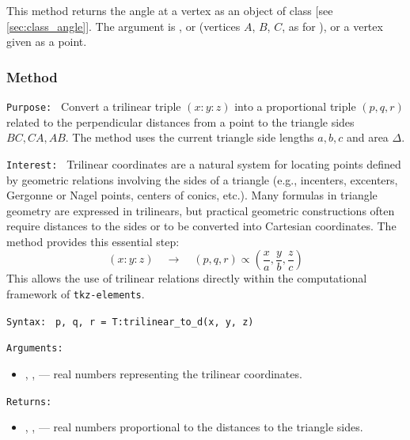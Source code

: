 This method returns the angle at a vertex as an object of class
 [see \ref{sec:class_angle}].
The argument  is ,  or  (vertices $A$, $B$, $C$,
as for ), or a vertex given as a point.

\begin{tkzexample}
\end{tkzexample}

\subsubsection{Method }
\label{ssub:triangle_trilinear_to_d}

\texttt{Purpose: }
Convert a trilinear triple \((x:y:z)\) into a proportional triple \((p,q,r)\) related to the perpendicular distances from a point to the triangle sides \(BC,CA,AB\).
The method uses the current triangle side lengths \(a,b,c\) and area \(\Delta\).

\medskip
\texttt{Interest: }
Trilinear coordinates are a natural system for locating points defined by geometric relations involving the sides of a triangle
(e.g., incenters, excenters, Gergonne or Nagel points, centers of conics, etc.).
Many formulas in triangle geometry are expressed in trilinears, but practical geometric constructions often require
distances to the sides or to be converted into Cartesian coordinates.
The method  provides this essential step:
\[
(x:y:z) \quad \longrightarrow \quad (p,q,r) \propto \left(\frac{x}{a}, \frac{y}{b}, \frac{z}{c}\right)
\]
This allows the use of trilinear relations directly within the computational framework of \texttt{tkz-elements}.

\medskip
\texttt{Syntax: }
\verb|p, q, r = T:trilinear_to_d(x, y, z)|

\medskip
\texttt{Arguments: }
\begin{itemize}
  \item {}, ,  — real numbers representing the trilinear coordinates.
\end{itemize}

\texttt{Returns: }
\begin{itemize}
  \item {}, ,  — real numbers proportional to the distances to the triangle sides.
\end{itemize}

